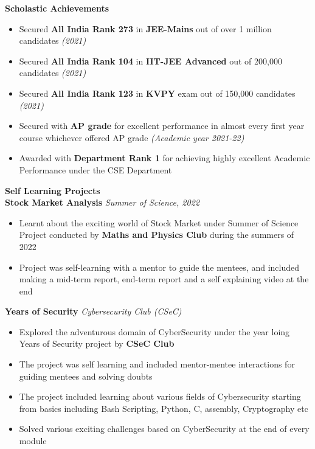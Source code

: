 \documentclass[]{article}
\begin{document}
\textcolor{blue!60!black}{\Large \textbf{Scholastic Achievements}}
\begin{itemize}
    \item Secured \textbf{All India Rank 273} in \textbf{JEE-Mains} out of over 1 million candidates
    \hfill \textit{\small (2021)}
    \item Secured \textbf{All India Rank 104} in \textbf{IIT-JEE Advanced} out of 200,000 candidates
    \hfill \textit{\small (2021)}
    \item Secured \textbf{All India Rank 123} in \textbf{KVPY} exam out of 150,000 candidates
    \hfill \textit{\small (2021)}
    \item Secured with \textbf{AP grade} for excellent performance in almost every first year course whichever offered AP grade
    \hfill \textit{\small (Academic year 2021-22)}
    \item Awarded with \textbf{Department Rank 1} for achieving highly excellent Academic Performance under the CSE Department
\end{itemize}
\vspace{1.25 em}

\textcolor{blue!60!black}{\Large \textbf{Self Learning Projects}}
\vspace{1 em}\\
\textbf{Stock Market Analysis}
\hfill\textit{\small Summer of Science, 2022}
\begin{itemize}
    \item Learnt about the exciting world of Stock Market under Summer of Science Project conducted by \textbf{Maths and Physics Club} during the summers of 2022
    \item Project was self-learning with a mentor to guide the mentees, and included making a mid-term report, end-term report and a self explaining video at the end
\end{itemize}
\textbf{Years of Security}
\hfill\textit{\small Cybersecurity Club (CSeC)}
\begin{itemize}
    \item Explored the adventurous domain of CyberSecurity under the year loing Years of Security project by \textbf{CSeC Club}
    \item The project was self learning and included mentor-mentee interactions for guiding mentees and solving doubts
    \item The project included learning about various fields of Cybersecurity starting from basics including Bash Scripting, Python, C, assembly, Cryptography etc
    \item Solved various exciting challenges based on CyberSecurity at the end of every module
\end{itemize}
\end{document}
